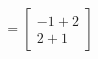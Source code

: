 \documentclass[preview]{standalone}
\begin{document}
\begin{align*}
\
                =\begin{bmatrix}-1+2\\2+1\end{bmatrix}\\
\end{align*}
\end{document}
